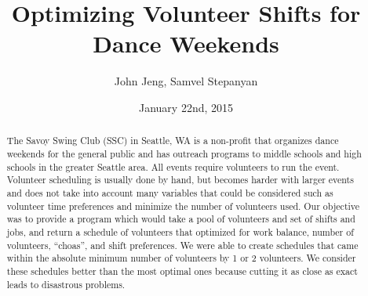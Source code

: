 \documentclass[11pt]{article}
\title{Optimizing Volunteer Shifts for Dance Weekends}
\author{John Jeng, Samvel Stepanyan}
\date{January 22nd, 2015}
\theoremstyle{definition}
\begin{document}
\maketitle
\begin{abstract}
	The Savoy Swing Club (SSC) in Seattle, WA is a non-profit that organizes dance weekends for the general public and has outreach programs to middle schools and high schools in the greater Seattle area. All events require volunteers to run the event. Volunteer scheduling is usually done by hand, but becomes harder with larger events and does not take into account many variables that could be considered such as volunteer time preferences and minimize the number of volunteers used. Our objective was to provide a program which would take a pool of volunteers and set of shifts and jobs, and return a schedule of volunteers that optimized for work balance, number of volunteers, ``choas'', and shift preferences. We were able to create schedules that came within the absolute minimum number of volunteers by 1 or 2 volunteers. We consider these schedules better than the most optimal ones because cutting it as close as exact leads to disastrous problems.
\end{abstract}
\noindent\makebox[\linewidth]{\rule{\textwidth}{0.4pt}}
\end{document}

